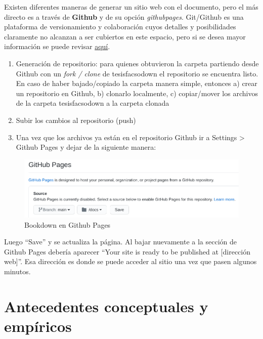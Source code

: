\documentclass[12pt,twoside]{templates/facsothesis}
\begin{document}
Existen diferentes maneras de generar un sitio web con el documento, pero el más directo es a través de \textbf{Github} y de su opción \emph{githubpages}. Git/Github es una plataforma de versionamiento y colaboración cuyos detalles y posibilidades claramente no alcanzan a ser cubiertos en este espacio, pero si se desea mayor información se puede revisar \href{https://cienciasocialabierta.netlify.app/class/08-class/}{aquí}.

\begin{enumerate}
\def\labelenumi{\arabic{enumi}.}
\item
  Generación de repositorio: para quienes obtuvieron la carpeta partiendo desde Github con un \emph{fork / clone} de tesisfacsodown el repositorio se encuentra listo. En caso de haber bajado/copiado la carpeta manera simple, entonces a) crear un repositorio en Github, b) clonarlo localmente, c) copiar/mover los archivos de la carpeta tesisfacsodown a la carpeta clonada
\item
  Subir los cambios al repositorio (push)
\item
  Una vez que los archivos ya están en el repositorio Github ir a Settings \textgreater{} Github Pages y dejar de la siguiente manera:
\end{enumerate}

\begin{figure}

{\centering \includegraphics[width=0.6\linewidth]{images/githubpages} 

}

\caption{Bookdown en Github Pages}\label{fig:githubpages}
\end{figure}

Luego ``Save'' y se actualiza la página. Al bajar nuevamente a la sección de Github Pages debería aparecer ``Your site is ready to be published at {[}dirección web{]}''. Esa dirección es donde se puede acceder al sitio una vez que pasen algunos minutos.

\hypertarget{antecedentes-conceptuales-y-empuxedricos}{%
\chapter{Antecedentes conceptuales y empíricos}\label{antecedentes-conceptuales-y-empuxedricos}}
\end{document}
